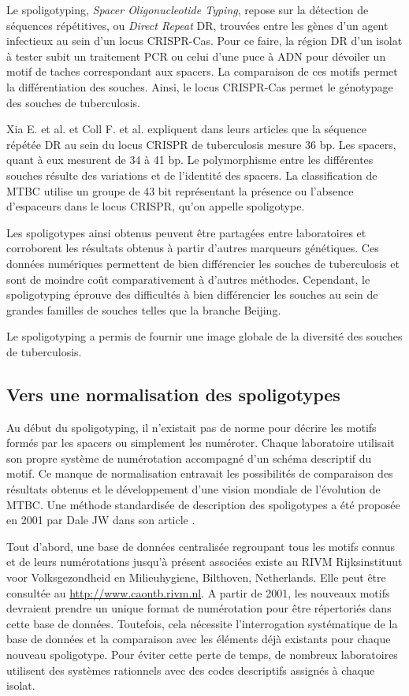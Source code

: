 \documentclass[twoside,a4paper,11pt,frenchb,openany]{report}
\begin{document}
Le spoligotyping, \textit{Spacer Oligonucleotide Typing}, repose sur la détection de séquences répétitives, ou \textit{Direct Repeat} DR, trouvées entre les gènes d'un agent infectieux au sein d'un locus CRISPR-Cas. Pour ce faire, la région DR d'un isolat à tester subit un traitement PCR ou celui d'une puce à ADN pour dévoiler un motif de taches correspondant aux spacers. La comparaison de ces motifs permet la différentiation des souches. Ainsi, le locus CRISPR-Cas permet le génotypage des souches de tuberculosis.

Xia E. et al. et Coll F. et al. expliquent dans leurs articles \cite{xia, coll} que la séquence répétée DR au sein du locus CRISPR de tuberculosis mesure 36 bp. Les spacers, quant à eux mesurent de 34 à 41 bp. Le polymorphisme entre les différentes souches résulte des variations et de l'identité des spacers. La classification de MTBC utilise un groupe de 43 bit représentant la présence ou l'absence d'espaceurs dans le locus CRISPR, qu'on appelle spoligotype.

Les spoligotypes ainsi obtenus peuvent être partagées entre laboratoires et corroborent les résultats obtenus à partir d'autres marqueurs génétiques. Ces données numériques permettent de bien différencier les souches de tuberculosis et sont de moindre coût comparativement à d'autres méthodes. Cependant, le spoligotyping éprouve des difficultés à bien différencier les souches au sein de grandes familles de souches telles que la branche Beijing.

Le spoligotyping a permis de fournir une image globale de la diversité des souches de tuberculosis.


\subsection{Vers une normalisation des spoligotypes}

Au début du spoligotyping, il n'existait pas de norme pour décrire les motifs formés par les spacers ou simplement les numéroter. Chaque laboratoire utilisait son propre système de numérotation accompagné d'un schéma descriptif du motif. Ce manque de normalisation entravait les possibilités de comparaison des résultats obtenus et le développement d'une vision mondiale de l'évolution de MTBC. Une méthode standardisée de description des spoligotypes a été proposée en 2001 par Dale JW dans son article \cite{dale}. 

Tout d'abord, une base de données centralisée regroupant tous les motifs connus et de leurs numérotations jusqu'à présent associées existe au RIVM Rijksinstituut voor Volksgezondheid en Milieuhygiene, Bilthoven, Netherlands. Elle peut être consultée au \url{http://www.caontb.rivm.nl}. A partir de 2001, les nouveaux motifs devraient prendre un unique format de numérotation pour être répertoriés dans cette base de données. Toutefois, cela nécessite l'interrogation systématique de la base de données et la comparaison avec les éléments déjà existants pour chaque nouveau spoligotype. Pour éviter cette perte de temps, de nombreux laboratoires utilisent des systèmes rationnels avec des codes descriptifs assignés à chaque isolat. 
\end{document}
